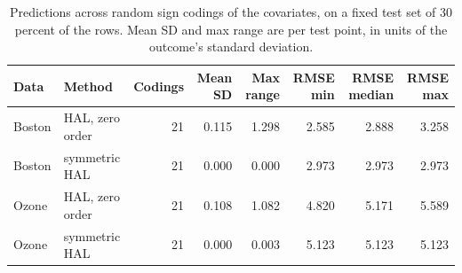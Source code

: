 \begin{table}[!h]
\centering
\caption{\label{tab:recode_predictions}Predictions across random sign codings of the covariates, on a fixed test set of 30 percent of the rows. Mean SD and max range are per test point, in units of the outcome's standard deviation.}
\centering
\begin{tabular}[t]{llrrrrrr}
\toprule
Data & Method & Codings & Mean SD & Max range & RMSE min & RMSE median & RMSE max\\
\midrule
Boston & HAL, zero order & 21 & 0.115 & 1.298 & 2.585 & 2.888 & 3.258\\
Boston & symmetric HAL & 21 & 0.000 & 0.000 & 2.973 & 2.973 & 2.973\\
Ozone & HAL, zero order & 21 & 0.108 & 1.082 & 4.820 & 5.171 & 5.589\\
Ozone & symmetric HAL & 21 & 0.000 & 0.003 & 5.123 & 5.123 & 5.123\\
\bottomrule
\end{tabular}
\end{table}
